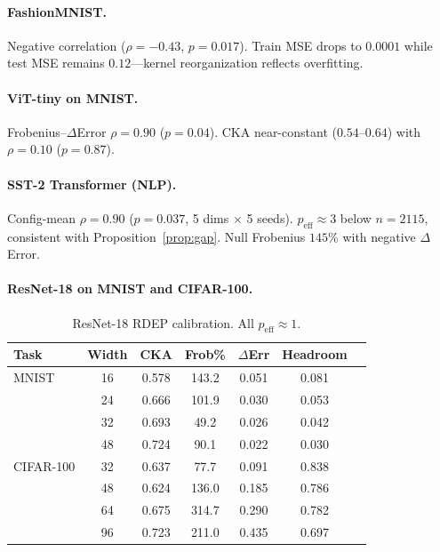 \documentclass[twoside,11pt]{article}
\begin{document}
\paragraph{FashionMNIST.} Negative correlation ($\rho=-0.43$, $p=0.017$). Train MSE drops to $0.0001$ while test MSE remains $0.12$---kernel reorganization reflects overfitting.

\paragraph{ViT-tiny on MNIST.} Frobenius--$\Delta$Error $\rho=0.90$ ($p=0.04$). CKA near-constant ($0.54$--$0.64$) with $\rho=0.10$ ($p=0.87$).

\paragraph{SST-2 Transformer (NLP).} Config-mean $\rho=0.90$ ($p=0.037$, 5 dims $\times$ 5 seeds). $p_{\text{eff}}\approx 3$ below $n=2115$, consistent with Proposition~\ref{prop:gap}. Null Frobenius $145\%$ with negative $\Delta$Error.

\paragraph{ResNet-18 on MNIST and CIFAR-100.}

\begin{table}[h]
\centering\small
\caption{ResNet-18 RDEP calibration. All $p_{\text{eff}} \approx 1$.}
\label{tab:resnet}
\begin{tabular}{lcccccc}
\toprule
Task & Width & CKA & Frob\% & $\Delta$Err & Headroom \\
\midrule
MNIST & 16 & 0.578 & 143.2 & 0.051 & 0.081 \\
      & 24 & 0.666 & 101.9 & 0.030 & 0.053 \\
      & 32 & 0.693 & 49.2 & 0.026 & 0.042 \\
      & 48 & 0.724 & 90.1 & 0.022 & 0.030 \\
\midrule
CIFAR-100 & 32 & 0.637 & 77.7 & 0.091 & 0.838 \\
          & 48 & 0.624 & 136.0 & 0.185 & 0.786 \\
          & 64 & 0.675 & 314.7 & 0.290 & 0.782 \\
          & 96 & 0.723 & 211.0 & 0.435 & 0.697 \\
\bottomrule
\end{tabular}
\end{table}
\end{document}
